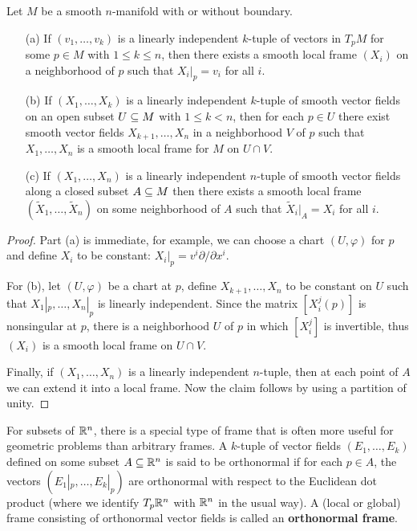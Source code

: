 \begin{proposition}\label{local frame completion}
Let $M$ be a smooth $n$-manifold with or without boundary.
\begin{itemize}
\item[(a)] If $(v_1,\dots,v_k)$ is a linearly independent $k$-tuple of vectors in $T_pM$ for some $p\in M$ with $1\leq k\leq n$, then there exists a smooth local frame $(X_i)$ on a neighborhood of $p$ such that $X_i|_p=v_i$ for all $i$.
\item[(b)] If $(X_1,\dots,X_k)$ is a linearly independent $k$-tuple of smooth vector fields on an open subset $U\subseteq M$ with $1\leq k<n$, then for each $p\in U$ there exist smooth vector fields $X_{k+1},\dots,X_n$ in a neighborhood $V$ of $p$ such that $X_1,\dots,X_n$ is a smooth local frame for $M$ on $U\cap V$.
\item[(c)] If $(X_1,\dots,X_n)$ is a linearly independent $n$-tuple of smooth vector fields along a closed subset $A\subseteq M$ then there exists a smooth local frame $(\widetilde{X}_1,\dots,\widetilde{X}_n)$ on some neighborhood of $A$ such that $\widetilde{X}_i|_A=X_i$ for all $i$.
\end{itemize}
\end{proposition}
\begin{proof}
Part (a) is immediate, for example, we can choose a chart $(U,\varphi)$ for $p$ and define $X_i$ to be constant: $X_i|_p=v^i\partial/\partial x^i$.\par
For (b), let $(U,\varphi)$ be a chart at $p$, define $X_{k+1},\dots,X_n$ to be constant on $U$ such that $X_1|_p,\dots,X_n|_p$ is linearly independent. Since the matrix $[X^j_i(p)]$ is nonsingular at $p$, there is a neighborhood $U$ of $p$ in which $[X^j_i]$ is invertible, thus $(X_i)$ is a smooth local frame on $U\cap V$.\par
Finally, if $(X_1,\dots,X_n)$ is a linearly independent $n$-tuple, then at each point of $A$ we can extend it into a local frame. Now the claim follows by using a partition of unity. 
\end{proof}
For subsets of $\mathbb{R}^n$, there is a special type of frame that is often more useful for geometric problems than arbitrary frames. A $k$-tuple of vector fields $(E_1,\dots,E_k)$ defined on some subset $A\subseteq\mathbb{R}^n$ is said to be orthonormal if for each $p\in A$, the vectors $(E_1|_p,\dots,E_k|_p)$ are orthonormal with respect to the Euclidean dot product (where we identify $T_p\mathbb{R}^n$ with $\mathbb{R}^n$ in the usual way). A (local or global) frame consisting of orthonormal vector fields is called an \textbf{orthonormal frame}.
